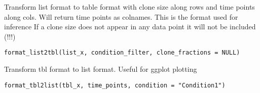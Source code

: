 \documentclass[a4paper]{book}
\begin{document}
%
\begin{Description}\relax
Transform list format to table format with clone size along rows and time points
along cols. Will return time points as colnames. This is the format used for inference
If a clone size does not appear in any data point it will not be included (!!!)
\end{Description}
%
\begin{Usage}
\begin{verbatim}
format_list2tbl(list_x, condition_filter, clone_fractions = NULL)
\end{verbatim}
\end{Usage}
%
\begin{Description}\relax
Transform tbl format to list format. Useful for ggplot plotting
\end{Description}
%
\begin{Usage}
\begin{verbatim}
format_tbl2list(tbl_x, time_points, condition = "Condition1")
\end{verbatim}
\end{Usage}
\printindex{}
\end{document}
